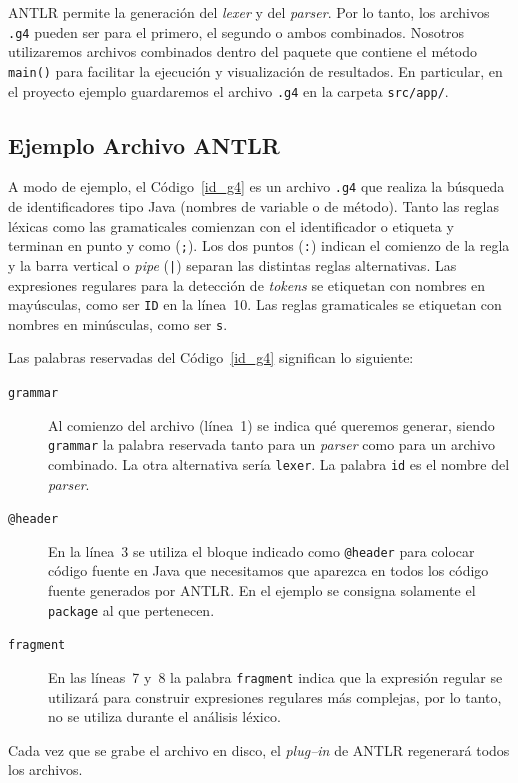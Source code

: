 \documentclass[a5paper,10pt]{article}
\begin{document}
ANTLR permite la generación del \emph{lexer} y del \emph{parser}.  Por lo tanto, los archivos \verb|.g4| pueden ser para el primero, el segundo o ambos combinados.  Nosotros utilizaremos archivos combinados dentro del paquete que contiene el método \verb|main()| para facilitar la ejecución y visualización de resultados.  En particular, en el proyecto ejemplo guardaremos el archivo \verb|.g4| en la carpeta \verb|src/app/|.


\subsection{Ejemplo Archivo ANTLR}
\label{ejemplo_archivo_antlr}



A modo de ejemplo, el Código~\ref{id_g4} es un archivo \verb|.g4| que realiza la búsqueda de identificadores tipo Java (nombres de variable o de método).  Tanto las reglas léxicas como las gramaticales comienzan con el identificador o etiqueta y terminan en punto y como (\verb|;|).  Los dos puntos (\verb|:|) indican el comienzo de la regla y la barra vertical o \emph{pipe} (\verb-|-) separan las distintas reglas alternativas.  Las expresiones regulares para la detección de \emph{tokens} se etiquetan con nombres en mayúsculas, como ser \verb|ID| en la línea~10.  Las reglas gramaticales se etiquetan con nombres en minúsculas, como ser \verb|s|.

Las palabras reservadas del Código~\ref{id_g4} significan lo siguiente:
\begin{description}
	\item[\texttt{grammar}] Al comienzo del archivo (línea~1) se indica qué queremos generar, siendo \verb|grammar| la palabra reservada tanto para un \emph{parser} como para un archivo combinado. La otra alternativa sería \verb|lexer|.  La palabra \verb|id| es el nombre del \emph{parser}.
	\item[\texttt{@header}] En la línea~3 se utiliza el bloque indicado como \verb|@header| para colocar código fuente en Java que necesitamos que aparezca en todos los código fuente generados por ANTLR.  En el ejemplo se consigna solamente el \verb|package| al que pertenecen.
	\item[\texttt{fragment}] En las líneas~7 y~8 la palabra \verb|fragment| indica que la expresión regular se utilizará para construir expresiones regulares más complejas, por lo tanto, no se utiliza durante el análisis léxico.
\end{description}

Cada vez que se grabe el archivo en disco, el \emph{plug--in} de ANTLR regenerará todos los archivos.
\end{document}
